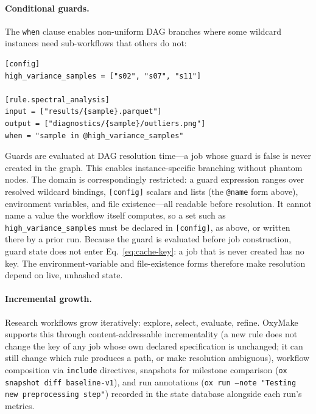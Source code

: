 \documentclass[12pt,a4paper]{article}
\newcommand{\code}[1]{{\texttt{\small\color{inlinecode}#1}}}
\begin{document}
\paragraph{Conditional guards.}
The \code{when} clause enables non-uniform DAG branches where some
wildcard instances need sub-workflows that others do not:

\begin{lstlisting}[style=toml]
[config]
high_variance_samples = ["s02", "s07", "s11"]

[rule.spectral_analysis]
input = ["results/{sample}.parquet"]
output = ["diagnostics/{sample}/outliers.png"]
when = "sample in @high_variance_samples"
\end{lstlisting}

Guards are evaluated at DAG resolution time---a job whose guard is false
is never created in the graph. This enables instance-specific
branching without phantom nodes. The domain is correspondingly
restricted: a guard expression ranges over resolved wildcard bindings,
\code{[config]} scalars and lists (the \code{@name} form above),
environment variables, and file existence---all readable before
resolution. It cannot name a value the workflow itself computes, so a
set such as \code{high\_variance\_samples} must be declared in
\code{[config]}, as above, or written there by a prior run.
Because the guard is evaluated before job construction, guard state
does not enter Eq.~\ref{eq:cache-key}: a job that is never created has
no key. The environment-variable and file-existence forms therefore
make resolution depend on live, unhashed state.

\paragraph{Incremental growth.}
Research workflows grow iteratively: explore, select, evaluate, refine.
OxyMake supports this through content-addressable incrementality (a new
rule does not change the key of any job whose own declared
specification is unchanged; it can still change which rule produces a
path, or make resolution ambiguous), workflow composition via
\code{include} directives, snapshots for milestone comparison
(\code{ox snapshot diff baseline-v1}), and run annotations
(\code{ox run --note "Testing new preprocessing step"}) recorded in the
state database alongside each run's metrics.

\end{document}
